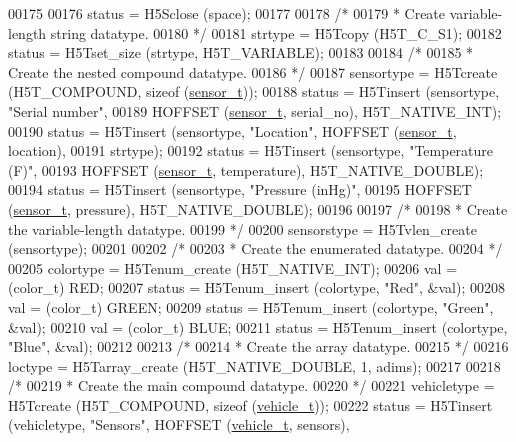 \begin{DoxyCode}
00175 
00176     status = H5Sclose (space);
00177 
00178     \textcolor{comment}{/*}
00179 \textcolor{comment}{     * Create variable-length string datatype.}
00180 \textcolor{comment}{     */}
00181     strtype = H5Tcopy (H5T\_C\_S1);
00182     status = H5Tset\_size (strtype, H5T\_VARIABLE);
00183 
00184     \textcolor{comment}{/*}
00185 \textcolor{comment}{     * Create the nested compound datatype.}
00186 \textcolor{comment}{     */}
00187     sensortype = H5Tcreate (H5T\_COMPOUND, \textcolor{keyword}{sizeof} (\hyperlink{structsensor__t}{sensor\_t}));
00188     status = H5Tinsert (sensortype, \textcolor{stringliteral}{"Serial number"},
00189                 HOFFSET (\hyperlink{structsensor__t}{sensor\_t}, serial\_no), H5T\_NATIVE\_INT);
00190     status = H5Tinsert (sensortype, \textcolor{stringliteral}{"Location"}, HOFFSET (\hyperlink{structsensor__t}{sensor\_t}, location),
00191                 strtype);
00192     status = H5Tinsert (sensortype, \textcolor{stringliteral}{"Temperature (F)"},
00193                 HOFFSET (\hyperlink{structsensor__t}{sensor\_t}, temperature), H5T\_NATIVE\_DOUBLE);
00194     status = H5Tinsert (sensortype, \textcolor{stringliteral}{"Pressure (inHg)"},
00195                 HOFFSET (\hyperlink{structsensor__t}{sensor\_t}, pressure), H5T\_NATIVE\_DOUBLE);
00196 
00197     \textcolor{comment}{/*}
00198 \textcolor{comment}{     * Create the variable-length datatype.}
00199 \textcolor{comment}{     */}
00200     sensorstype = H5Tvlen\_create (sensortype);
00201 
00202     \textcolor{comment}{/*}
00203 \textcolor{comment}{     * Create the enumerated datatype.}
00204 \textcolor{comment}{     */}
00205     colortype = H5Tenum\_create (H5T\_NATIVE\_INT);
00206     val = (color\_t) RED;
00207     status = H5Tenum\_insert (colortype, \textcolor{stringliteral}{"Red"}, &val);
00208     val = (color\_t) GREEN;
00209     status = H5Tenum\_insert (colortype, \textcolor{stringliteral}{"Green"}, &val);
00210     val = (color\_t) BLUE;
00211     status = H5Tenum\_insert (colortype, \textcolor{stringliteral}{"Blue"}, &val);
00212 
00213     \textcolor{comment}{/*}
00214 \textcolor{comment}{     * Create the array datatype.}
00215 \textcolor{comment}{     */}
00216     loctype = H5Tarray\_create (H5T\_NATIVE\_DOUBLE, 1, adims);
00217 
00218     \textcolor{comment}{/*}
00219 \textcolor{comment}{     * Create the main compound datatype.}
00220 \textcolor{comment}{     */}
00221     vehicletype = H5Tcreate (H5T\_COMPOUND, \textcolor{keyword}{sizeof} (\hyperlink{structvehicle__t}{vehicle\_t}));
00222     status = H5Tinsert (vehicletype, \textcolor{stringliteral}{"Sensors"}, HOFFSET (\hyperlink{structvehicle__t}{vehicle\_t}, sensors),

\end{DoxyCode}

